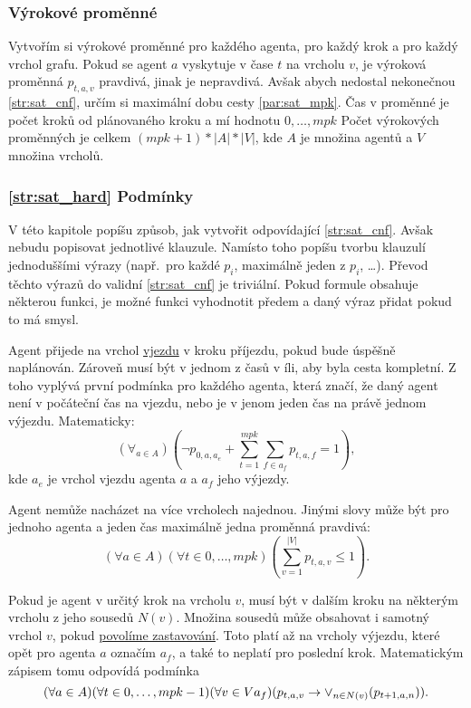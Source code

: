 \subsubsection{Výrokové proměnné}\label{subsubsec:sat_vyrokove_promenne}

Vytvořím si výrokové proměnné pro každého agenta, pro každý krok a pro každý vrchol grafu.
Pokud se agent $a$ vyskytuje v čase $t$ na vrcholu $v$, je výroková proměnná $p_{t,a,v}$ pravdivá, jinak je nepravdivá.
Avšak abych nedostal nekonečnou \ref{str:sat_cnf}, určím si maximální dobu cesty \ref{par:sat_mpk}.
Čas v proměnné je počet kroků od plánovaného kroku a mí hodnotu ${0, \dots, mpk}$
Počet výrokových proměnných je celkem $(mpk + 1) * |A| * |V|$, kde $A$ je množina agentů a $V$ množina vrcholů.

\subsubsection{\ref{str:sat_hard} Podmínky}\label{subsubsec:sat_hard_podminky}

V této kapitole popíšu způsob, jak vytvořit odpovídající \ref{str:sat_cnf}.
Avšak nebudu popisovat jednotlivé klauzule.
Namísto toho popíšu tvorbu klauzulí jednoduššími výrazy (např.\ pro každé $p_i$, maximálně jeden z $p_i$, \ldots).
Převod těchto výrazů do validní \ref{str:sat_cnf} je triviální.
Pokud formule obsahuje některou funkci, je možné funkci vyhodnotit předem a daný výraz přidat pokud to má smysl.

Agent přijede na vrchol \hyperref[par:vjezdy]{vjezdu} v kroku příjezdu, pokud bude úspěšně naplánován.
Zároveň musí být v jednom z časů v íli, aby byla cesta kompletní.
Z toho vyplývá první podmínka pro každého agenta, která značí, že daný agent není v počáteční čas na vjezdu,
nebo je v jenom jeden čas na právě jednom výjezdu.
Matematicky:
\[
	(\forall_{a \in A}) \left(\neg p_{0,a,a_e} + \sum_{t=1}^{mpk} \sum_{f \in a_f} p_{t, a, f} = 1\right),
\]
kde $a_e$ je vrchol vjezdu agenta $a$ a $a_f$ jeho výjezdy.

Agent nemůže nacházet na více vrcholech najednou.
Jinými slovy může být pro jednoho agenta a jeden čas maximálně jedna proměnná pravdivá:
\[
	(\forall a \in A)(\forall t \in {0, \dots, mpk})\left(\sum_{v=1}^{|V|} p_{t,a,v} \leq 1\right).
\]

Pokud je agent v určitý krok na vrcholu $v$, musí být v dalším kroku na některým vrcholu z jeho sousedů $N(v)$.
Množina sousedů může obsahovat i samotný vrchol $v$,
pokud \hyperref[par:sat_povolene_zastavovani]{povolíme zastavování}.
Toto platí až na vrcholy výjezdu, které opět pro agenta $a$ označím $a_f$, a také to neplatí pro poslední krok.
Matematickým zápisem tomu odpovídá podmínka
\[
	(\forall a \in A)(\forall t \in {0, \dots, mpk - 1})
	(\forall v \in V\\a_f)(p_{t,a,v} \rightarrow \vee_{n \in N(v)} (p_{t+1,a,n})).
\]

